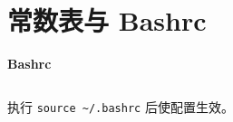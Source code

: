 \section{常数表与 Bashrc}


\medskip
\noindent\textbf{Bashrc}

\inputminted{sh}{sections/OtherTools/assets/Miscellany/bashrc}
执行 \texttt{source \textasciitilde/.bashrc} 后使配置生效。
